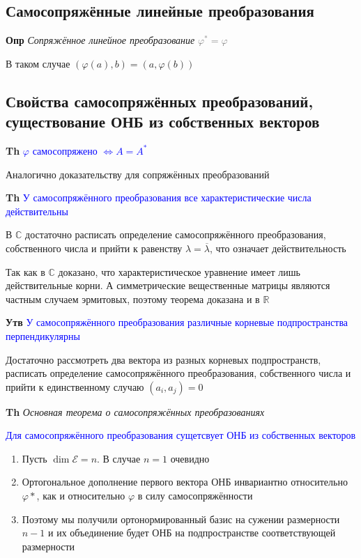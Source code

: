 \documentclass[a4paper, 14pt]{article}
\begin{document}
    \subsection{Самосопряжённые линейные преобразования}

    \textbf{Опр} \textit{Сопряжённое линейное преобразование} \textcolor{gray}{$\varphi^* = \varphi$}

    В таком случае $(\varphi (a), b) = (a, \varphi(b))$

    \subsection{Свойства самосопряжённых преобразований, существование ОНБ из собственных векторов}

    \textbf{Th} \textcolor{blue}{$\varphi$ самосопряжено $\Leftrightarrow A = A^*$}

    Аналогично доказательству для сопряжённых преобразований

    \textbf{Th} \textcolor{blue}{У самосопряжённого преобразования все характеристические числа действительны}

    В $\mathbb{C}$ достаточно расписать определение самосопряжённого преобразования, собственного числа и прийти к
    равенству $\lambda = \overline{\lambda}$, что означает действительность

    Так как в $\mathbb{C}$ доказано, что характеристическое уравнение имеет лишь действительные корни.
    А симметрические вещественные матрицы являются частным случаем эрмитовых, поэтому теорема доказана и в $\mathbb{R}$

    \textbf{Утв} \textcolor{blue}{У самосопряжённого преобразования различные корневые подпространства перпендикулярны}

    Достаточно рассмотреть два вектора из разных корневых подпространств, расписать определение самосопряжённого
    преобразования, собственного числа и прийти к единственному случаю $(a_i, a_j) = 0$

    \textbf{Th} \textit{Основная теорема о самосопряжённых преобразованиях}

    \textcolor{blue}{Для самосопряжённого преобразования сущетсвует ОНБ из собственных векторов}

    \begin{enumerate}
        \item Пусть $\dim \mathscr{E} = n$.
        В случае $n = 1$ очевидно
        \item Ортогональное дополнение первого вектора ОНБ инвариантно относительно $\varphi*$, как и относительно $\varphi$ в
        силу самосопряжённости
        \item Поэтому мы получили ортонормированный базис на сужении размерности $n - 1$ и их объединение будет ОНБ на
        подпространстве соответствующей размерности
    \end{enumerate}
\end{document}
